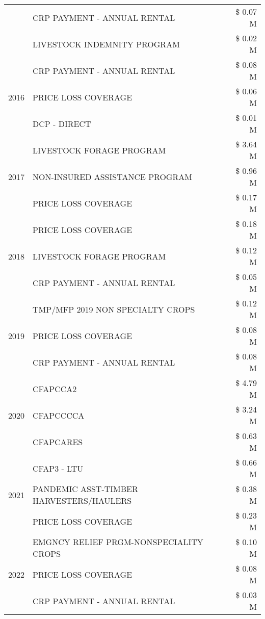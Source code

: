 \begin{tabular}{llr}
 & CRP PAYMENT - ANNUAL RENTAL & \$ 0.07 M \\
 & LIVESTOCK INDEMNITY PROGRAM & \$ 0.02 M \\
\cline{1-3}
\multirow[t]{3}{*}{2016} & CRP PAYMENT - ANNUAL RENTAL & \$ 0.08 M \\
 & PRICE LOSS COVERAGE & \$ 0.06 M \\
 & DCP - DIRECT & \$ 0.01 M \\
\cline{1-3}
\multirow[t]{3}{*}{2017} & LIVESTOCK FORAGE PROGRAM & \$ 3.64 M \\
 & NON-INSURED ASSISTANCE PROGRAM & \$ 0.96 M \\
 & PRICE LOSS COVERAGE & \$ 0.17 M \\
\cline{1-3}
\multirow[t]{3}{*}{2018} & PRICE LOSS COVERAGE & \$ 0.18 M \\
 & LIVESTOCK FORAGE PROGRAM & \$ 0.12 M \\
 & CRP PAYMENT - ANNUAL RENTAL & \$ 0.05 M \\
\cline{1-3}
\multirow[t]{3}{*}{2019} & TMP/MFP 2019 NON SPECIALTY CROPS & \$ 0.12 M \\
 & PRICE LOSS COVERAGE & \$ 0.08 M \\
 & CRP PAYMENT - ANNUAL RENTAL & \$ 0.08 M \\
\cline{1-3}
\multirow[t]{3}{*}{2020} & CFAPCCA2 & \$ 4.79 M \\
 & CFAPCCCCA & \$ 3.24 M \\
 & CFAPCARES & \$ 0.63 M \\
\cline{1-3}
\multirow[t]{3}{*}{2021} & CFAP3 - LTU & \$ 0.66 M \\
 & PANDEMIC ASST-TIMBER HARVESTERS/HAULERS & \$ 0.38 M \\
 & PRICE LOSS COVERAGE & \$ 0.23 M \\
\cline{1-3}
\multirow[t]{3}{*}{2022} & EMGNCY RELIEF PRGM-NONSPECIALITY CROPS & \$ 0.10 M \\
 & PRICE LOSS COVERAGE & \$ 0.08 M \\
 & CRP PAYMENT - ANNUAL RENTAL & \$ 0.03 M \\
\cline{1-3}
\bottomrule
\end{tabular}
